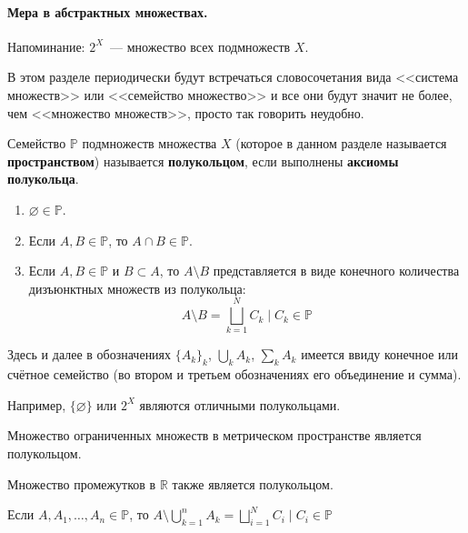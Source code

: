 \documentclass{article}
\begin{document}
    \paragraph{Мера в абстрактных множествах.}
    \begin{remark}
        Напоминание: $2^X$~--- множество всех подмножеств $X$.
    \end{remark}
    \begin{remark}
        В этом разделе периодически будут встречаться словосочетания вида <<система множеств>> или <<семейство множество>> и все они будут значит не более, чем <<множество множеств>>, просто так говорить неудобно.
    \end{remark}
    \begin{definition}
        Семейство $\mathbb P$ подмножеств множества $X$ (которое в данном разделе называется \textbf{пространством}) называется \textbf{полукольцом}, если выполнены \textbf{аксиомы полукольца}.
        \begin{enumerate}
            \item $\varnothing\in\mathbb P$.
            \item Если $A,B\in\mathbb P$, то $A\cap B\in\mathbb P$.
            \item Если $A,B\in\mathbb P$ и $B\subset A$, то $A\setminus B$ представляется в виде конечного количества дизъюнктных множеств из полукольца:
            $$
            A\setminus B=\bigsqcup\limits_{k=1}^NC_k\mid C_k\in\mathbb P
            $$
        \end{enumerate}
    \end{definition}
    \begin{remark}
        Здесь и далее в обозначениях $\{A_k\}_k$, $\bigcup\limits_kA_k$, $\sum\limits_kA_k$ имеется ввиду конечное или счётное семейство (во втором и третьем обозначениях его объединение и сумма).
    \end{remark}
    \begin{example}
        Например, $\{\varnothing\}$ или $2^X$ являются отличными полукольцами.
    \end{example}
    \begin{example}
        Множество ограниченных множеств в метрическом пространстве является полукольцом.
    \end{example}
    \begin{example}
        Множество промежутков в $\mathbb R$ также является полукольцом.
    \end{example}
    \begin{property}
        \label{prop:1 полукольца}
        Если $A,A_1,\ldots,A_n\in\mathbb P$, то $A\setminus\bigcup\limits_{k=1}^nA_k=\bigsqcup\limits_{i=1}^N C_i\mid C_i\in\mathbb P$
    \end{property}
\end{document}
